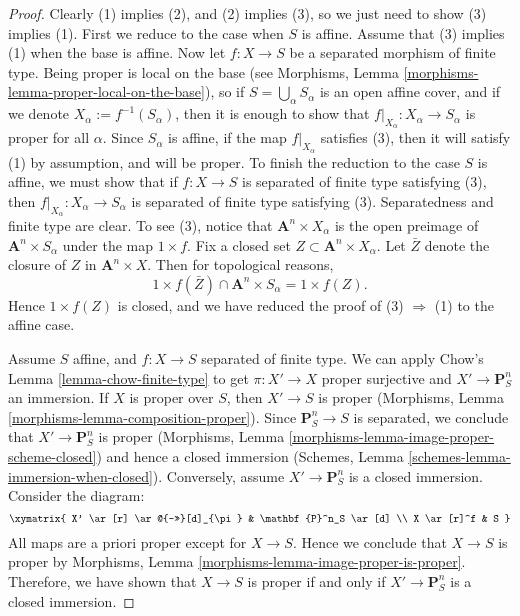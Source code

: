 \begin{proof}
Clearly (1) implies (2), and (2) implies (3), so we just need to show (3)
implies (1).
First we reduce to the case when $S$ is affine.  Assume that (3) implies (1)
when the base is affine.  Now let $f: X \to S$ be a separated morphism of
finite type.  Being proper is local on the base
(see Morphisms, Lemma \ref{morphisms-lemma-proper-local-on-the-base}), so if
$S = \bigcup_\alpha S_\alpha$ is an open affine cover, and if
we denote $X_\alpha := f^{-1}(S_\alpha)$, then it is
enough to show that $f|_{X_\alpha}: X_\alpha \to S_\alpha$ is proper
for all $\alpha$.  Since $S_\alpha$ is affine, if
the map $f|_{X_\alpha}$ satisfies (3), then it will satisfy (1)
by assumption, and will be proper.  To finish the reduction to the
case $S$ is affine, we must show that if $f: X \to S$ is separated of
finite type satisfying (3), then $f|_{X_\alpha} : X_\alpha \to S_\alpha$
is separated of finite type satisfying (3).  Separatedness and finite
type are clear.  To see (3), notice that
$\mathbf{A}^n \times X_\alpha$ is the open preimage of
$\mathbf{A}^n \times S_\alpha$ under the map $1 \times f$.  Fix a closed
set $Z \subset \mathbf A^n \times X_\alpha$.  Let $\bar Z$ denote the
closure of $Z$ in $\mathbf{A}^n \times X$.  Then for topological
reasons,
$$
1 \times f(\bar Z) \cap \mathbf{A}^n \times S_\alpha  = 1 \times f(Z).
$$
Hence $1 \times f(Z)$ is closed, and we have reduced the proof of
(3) $\Rightarrow$ (1) to the affine case.

\medskip\noindent
Assume $S$ affine, and $f : X \to S$ separated of finite type.
We can apply Chow's Lemma \ref{lemma-chow-finite-type}
to get $\pi : X' \to X$ proper surjective and $X' \to \mathbf{P}^n_S$
an immersion. If $X$ is proper over $S$, then $X' \to S$ is proper
(Morphisms, Lemma \ref{morphisms-lemma-composition-proper}). Since
$\mathbf{P}^n_S \to S$ is separated, we conclude that $X' \to
\mathbf{P}^n_S$ is proper
(Morphisms, Lemma \ref{morphisms-lemma-image-proper-scheme-closed})
and hence a closed immersion
(Schemes, Lemma \ref{schemes-lemma-immersion-when-closed}).
Conversely, assume $X' \to \mathbf{P}^n_S$ is a closed immersion.
Consider the diagram:
\begin{equation}
\label{equation-check-proper}
\xymatrix{
X' \ar[r] \ar@{->>}[d]_{\pi} &
\mathbf{P}^n_S \ar[d] \\
X \ar[r]^f & S
}
\end{equation}
All maps are a priori proper except for $X \to S$.
Hence we conclude that $X \to S$ is proper by
Morphisms, Lemma \ref{morphisms-lemma-image-proper-is-proper}.
Therefore, we have shown that $X \to S$ is proper if and only if
$X' \to \mathbf{P}^n_S$ is a closed immersion.


\end{proof}
